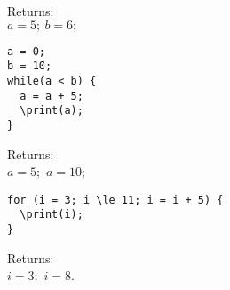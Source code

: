 Returns:\\
$ a=5;\ b=6; $

\begin{verbatim}
a = 0;
b = 10;
while(a < b) {
  a = a + 5;
  \print(a);
}
\end{verbatim}

Returns: \\
$a = 5;$
$a = 10;$

\begin{verbatim}
for (i = 3; i \le 11; i = i + 5) { 
  \print(i);
}
\end{verbatim}

Returns:\\ $i = 3;$ 
$i = 8. $
